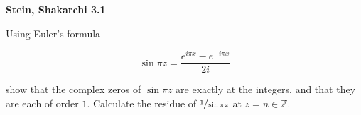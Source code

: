 \textbf{Stein, Shakarchi 3.1}

Using Euler's formula

$$
\sin{\pi z} = \frac{e^{i \pi x} - e^{-i \pi x}}{2i}
$$

show that the complex zeros of $\sin{\pi z}$ are exactly at the integers, and that they are each of order $1$. Calculate
the residue of $\sfrac{1}{\sin{\pi z}}$ at $z = n \in \mathbb{Z}$.

\begin{solution}
  \ \\
\end{solution}
